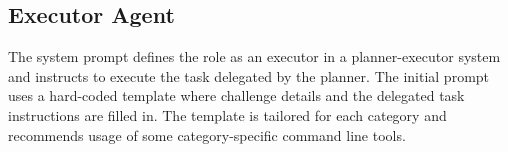 







\subsection{Executor Agent}

The system prompt defines the role as an executor in a planner-executor system and instructs to execute the task delegated by the planner.
The initial prompt uses a hard-coded template where challenge details and the delegated task instructions are filled in.
The template is tailored for each category and recommends usage of some category-specific command line tools.


